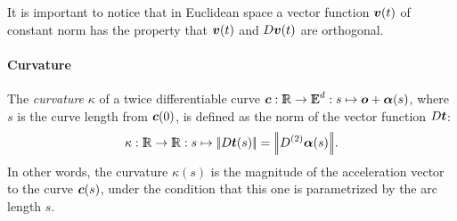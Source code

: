 \documentclass{31x47jw}
\begin{document}
It is important to notice that in Euclidean space a vector
function ${\mbox{\boldmath $v$}}(t)$ of constant norm has the property that ${\mbox{\boldmath $v$}}(t)$
and $D{\mbox{\boldmath $v$}}(t)$ are orthogonal.



% 
% 
% 
% 
% 
% 
% 
% 
% 


\paragraph{Curvature}


The {\it curvature} $\kappa$ of a twice differentiable curve
${\mbox{\boldmath $c$}}:\mathbb{I\!\!R}\rightarrow{\mathbb{I\!\!E}}^{d}: s\mapsto {\mbox{\boldmath $o$}}+ {\mbox{\boldmath $\alpha$}}(s)$, where $s$ is
the curve length from ${\mbox{\boldmath $c$}}(0)$, is defined as the norm of the vector
function $D{\mbox{\boldmath $t$}}$:
\[
\kappa:\R\rightarrow\R: s \mapsto \module{ D\v{t}(s) } =
\module{D^{(2)}\v{\alpha}(s)}.
\]
In other words, the curvature $\kappa(s)$ is the magnitude of the acceleration 
vector to the curve ${\mbox{\boldmath $c$}}(s)$, under the condition that this one is 
parametrized by the arc length $s$.
\end{document}
